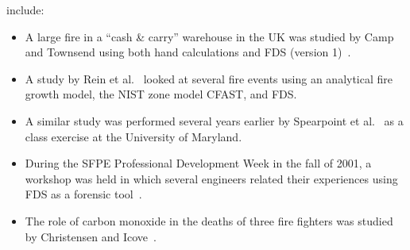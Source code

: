 include:
\begin{itemize}
\item A large fire in a ``cash \& carry'' warehouse in the UK was studied by Camp and Townsend using both hand calculations and FDS (version 1)~\cite{Camp:Interflam2001}.
\item A study by Rein et al.~\cite{Rein:Interflam2004} looked at several fire events using an analytical fire growth model, the NIST zone model CFAST, and FDS.
\item A similar study was performed several years earlier by Spearpoint et al.~\cite{Spearpoint:ICFRE3} as a class exercise at the University of Maryland.
\item During the SFPE Professional Development Week in the fall of 2001, a workshop was held in which several engineers related their experiences using FDS as a forensic tool~\cite{Carpenter:SFPE2001}.
\item The role of carbon monoxide in the deaths of three fire fighters was studied by Christensen and Icove~\cite{Christensen:JFS}.
\end{itemize}
